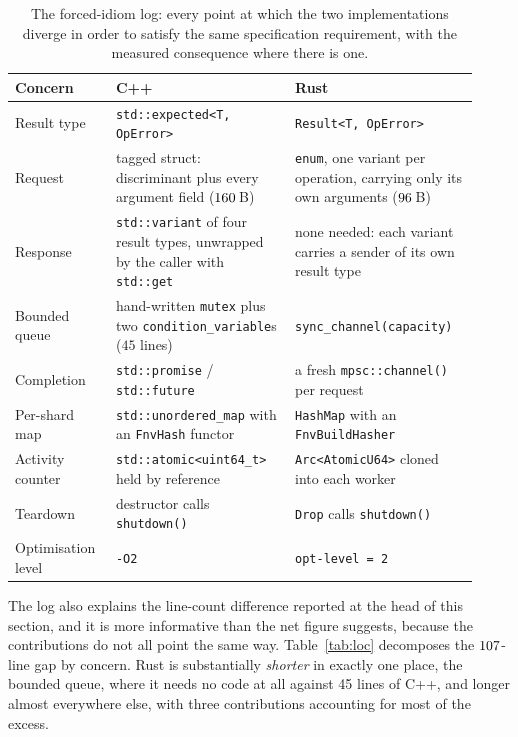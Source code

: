 \documentclass[english,twoside,openright,a4paper,censored,csm,software-track-2020]{HYthesisML}
\begin{document}
\begin{table}[H]
\centering
\small
\caption[The forced-idiom log]{The forced-idiom log: every point at which the two implementations diverge in order
to satisfy the same specification requirement, with the measured consequence where there is
one.\label{tab:idioms}}
\begin{tabular}{@{}R{0.20\linewidth} R{0.36\linewidth} R{0.36\linewidth}@{}}
\hline\hline
Concern & C++ & Rust \\
\hline
Result type & \texttt{std::expected<T, OpError>} & \texttt{Result<T, OpError>} \\
Request & tagged struct: discriminant plus every argument field ($160$\,B) & \texttt{enum}, one variant per operation, carrying only its own arguments ($96$\,B) \\
Response & \texttt{std::variant} of four result types, unwrapped by the caller with \texttt{std::get} & none needed: each variant carries a sender of its own result type \\
Bounded queue & hand-written \texttt{mutex} plus two \texttt{condition\_variable}s ($45$ lines) & \texttt{sync\_channel(capacity)} \\
Completion & \texttt{std::promise} / \texttt{std::future} & a fresh \texttt{mpsc::channel()} per request \\
Per-shard map & \texttt{std::unordered\_map} with an \texttt{FnvHash} functor & \texttt{HashMap} with an \texttt{FnvBuildHasher} \\
Activity counter & \texttt{std::atomic<uint64\_t>} held by reference & \texttt{Arc<AtomicU64>} cloned into each worker \\
Teardown & destructor calls \texttt{shutdown()} & \texttt{Drop} calls \texttt{shutdown()} \\
Optimisation level & \texttt{-O2} & \texttt{opt-level = 2} \\
\hline
\end{tabular}
\end{table}

The log also explains the line-count difference reported at the head of this section, and it
is more informative than the net figure suggests, because the contributions do not all point
the same way. Table~\ref{tab:loc} decomposes the $107$-line gap by concern. Rust is
substantially \emph{shorter} in exactly one place, the bounded queue, where it needs no code
at all against 45 lines of C++, and longer almost everywhere else, with three contributions
accounting for most of the excess.
\end{document}
